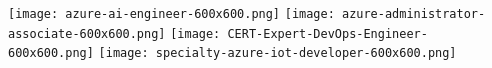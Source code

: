 \begin{cvhonors}
{\begin{cvitems}
{          \texttt{[image: azure-ai-engineer-600x600.png]}
          \texttt{[image: azure-administrator-associate-600x600.png]}
          \texttt{[image: CERT-Expert-DevOps-Engineer-600x600.png]}
          \texttt{[image: specialty-azure-iot-developer-600x600.png]}

          }
\end{cvitems}
}
\end{cvhonors}